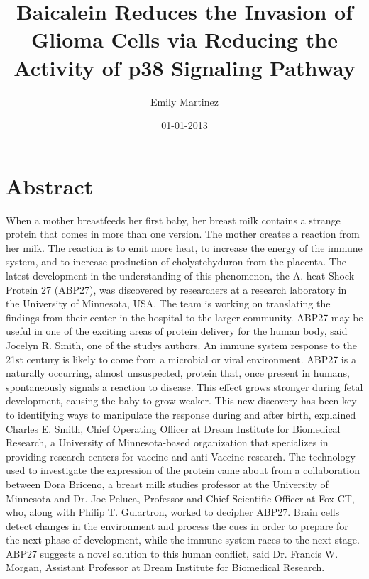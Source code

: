 \documentclass{article}%
\title{Baicalein Reduces the Invasion of Glioma Cells via Reducing the Activity of p38 Signaling Pathway}%
\author{Emily Martinez}%
\affil{Department of Gastroenterology, Justus Liebig University, Giessen, Germany}%
\date{01{-}01{-}2013}%
\begin{document}
%
\normalsize%
\maketitle%
\section{Abstract}%
\label{sec:Abstract}%
When a mother breastfeeds her first baby, her breast milk contains a strange protein that comes in more than one version. The mother creates a reaction from her milk. The reaction is to emit more heat, to increase the energy of the immune system, and to increase production of cholystehyduron from the placenta.\newline%
The latest development in the understanding of this phenomenon, the A. heat Shock Protein 27 (ABP27), was discovered by researchers at a research laboratory in the University of Minnesota, USA. The team is working on translating the findings from their center in the hospital to the larger community.\newline%
ABP27 may be useful in one of the exciting areas of protein delivery for the human body, said Jocelyn R. Smith, one of the studys authors.\newline%
An immune system response to the 21st century is likely to come from a microbial or viral environment. ABP27 is a naturally occurring, almost unsuspected, protein that, once present in humans, spontaneously signals a reaction to disease. This effect grows stronger during fetal development, causing the baby to grow weaker. This new discovery has been key to identifying ways to manipulate the response during and after birth, explained Charles E. Smith, Chief Operating Officer at Dream Institute for Biomedical Research, a University of Minnesota{-}based organization that specializes in providing research centers for vaccine and anti{-}Vaccine research.\newline%
The technology used to investigate the expression of the protein came about from a collaboration between Dora Briceno, a breast milk studies professor at the University of Minnesota and Dr. Joe Peluca, Professor and Chief Scientific Officer at Fox CT, who, along with Philip T. Gulartron, worked to decipher ABP27.\newline%
Brain cells detect changes in the environment and process the cues in order to prepare for the next phase of development, while the immune system races to the next stage. ABP27 suggests a novel solution to this human conflict, said Dr. Francis W. Morgan, Assistant Professor at Dream Institute for Biomedical Research.\newline%
\end{document}
